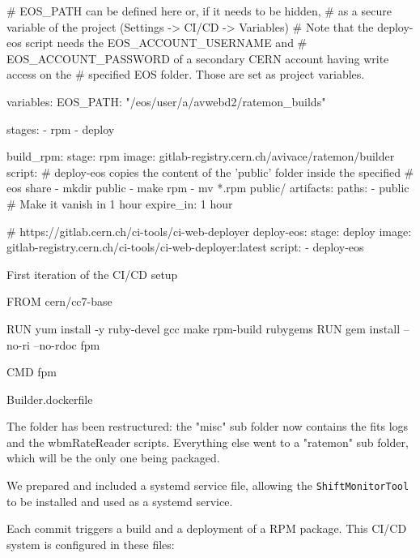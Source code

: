 \begin{listing}[ht]
\begin{yamlcode}

# EOS_PATH can be defined here or, if it needs to be hidden, 
# as a secure variable of the project (Settings -> CI/CD -> Variables)
# Note that the deploy-eos script needs the EOS_ACCOUNT_USERNAME and 
# EOS_ACCOUNT_PASSWORD of a secondary CERN account having write access on the
# specified EOS folder. Those are set as project variables.

variables:
  EOS_PATH: "/eos/user/a/avwebd2/ratemon_builds"

stages:
  - rpm
  - deploy

build_rpm:
  stage: rpm
  image: gitlab-registry.cern.ch/avivace/ratemon/builder
  script:
    # deploy-eos copies the content of the 'public' folder inside the specified
    # eos share
    - mkdir public
    - make rpm
    - mv *.rpm public/
  artifacts:
    paths:
      - public
    # Make it vanish in 1 hour
    expire_in: 1 hour

# https://gitlab.cern.ch/ci-tools/ci-web-deployer
deploy-eos:
  stage: deploy
  image: gitlab-registry.cern.ch/ci-tools/ci-web-deployer:latest
  script:
    - deploy-eos

\end{yamlcode}
\caption{First iteration of the CI/CD setup}
\end{listing}

\begin{listing}[ht]
\begin{yamlcode}
FROM cern/cc7-base

RUN yum install -y ruby-devel gcc make rpm-build rubygems
RUN gem install --no-ri --no-rdoc fpm

CMD fpm
\end{yamlcode}
\caption{Builder.dockerfile}
\end{listing}

The folder has been restructured: the "misc" sub folder now contains the fits logs and the wbmRateReader scripts. Everything else went to a "ratemon" sub folder, which will be the only one being packaged.

We prepared and included a systemd service file, allowing the \texttt{ShiftMonitorTool} to be installed and used as a systemd service.

Each commit triggers a build and a deployment of a RPM package. This CI/CD system is configured in these files:

